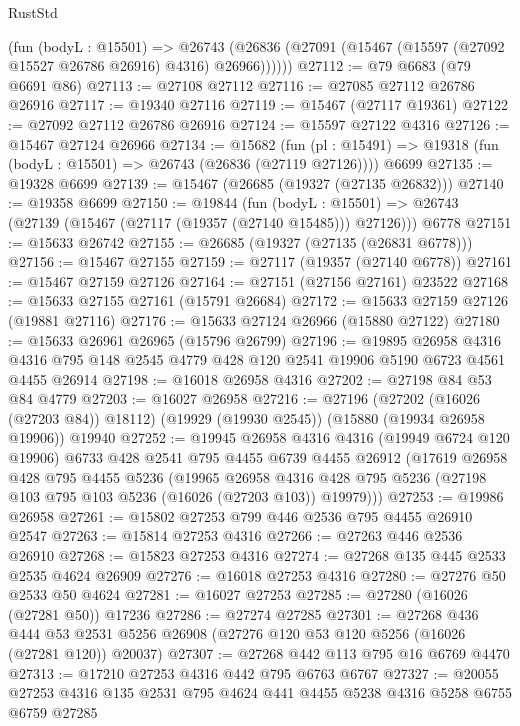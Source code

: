\begin{lexlean}{RustStd}
\begin{coremodule}
        (fun (bodyL : @15501) =>
        @26743 (@26836 (@27091 (@15467 (@15597 (@27092 @15527 @26786 @26916) @4316) @26966))))))
@27112 := @79 @6683 (@79 @6691 @86)
@27113 := @27108 @27112
@27116 := @27085 @27112 @26786 @26916
@27117 := @19340 @27116
@27119 := @15467 (@27117 @19361)
@27122 := @27092 @27112 @26786 @26916
@27124 := @15597 @27122 @4316
@27126 := @15467 @27124 @26966
@27134 := @15682
    (fun (pl : @15491) => @19318 (fun (bodyL : @15501) => @26743 (@26836 (@27119 @27126))))
    @6699
@27135 := @19328 @6699
@27139 := @15467 (@26685 (@19327 (@27135 @26832)))
@27140 := @19358 @6699
@27150 := @19844
    (fun (bodyL : @15501) => @26743 (@27139 (@15467 (@27117 (@19357 (@27140 @15485))) @27126)))
    @6778
@27151 := @15633 @26742
@27155 := @26685 (@19327 (@27135 (@26831 @6778)))
@27156 := @15467 @27155
@27159 := @27117 (@19357 (@27140 @6778))
@27161 := @15467 @27159 @27126
@27164 := @27151 (@27156 @27161) @23522
@27168 := @15633 @27155 @27161 (@15791 @26684)
@27172 := @15633 @27159 @27126 (@19881 @27116)
@27176 := @15633 @27124 @26966 (@15880 @27122)
@27180 := @15633 @26961 @26965 (@15796 @26799)
@27196 := @19895
    @26958
    @4316
    @4316
    @795
    @148
    @2545
    @4779
    @428
    @120
    @2541
    @19906
    @5190
    @6723
    @4561
    @4455
    @26914
@27198 := @16018 @26958 @4316
@27202 := @27198 @84 @53 @84 @4779
@27203 := @16027 @26958
@27216 := @27196
    (@27202 (@16026 (@27203 @84)) @18112)
    (@19929 (@19930 @2545))
    (@15880 (@19934 @26958 @19906))
    @19940
@27252 := @19945
    @26958
    @4316
    @4316
    (@19949 @6724 @120 @19906)
    @6733
    @428
    @2541
    @795
    @4455
    @6739
    @4455
    @26912
    (@17619
      @26958
      @428
      @795
      @4455
      @5236
      (@19965
        @26958
        @4316
        @428
        @795
        @5236
        (@27198 @103 @795 @103 @5236 (@16026 (@27203 @103)) @19979)))
@27253 := @19986 @26958
@27261 := @15802 @27253 @799 @446 @2536 @795 @4455 @26910 @2547
@27263 := @15814 @27253 @4316
@27266 := @27263 @446 @2536 @26910
@27268 := @15823 @27253 @4316
@27274 := @27268 @135 @445 @2533 @2535 @4624 @26909
@27276 := @16018 @27253 @4316
@27280 := @27276 @50 @2533 @50 @4624
@27281 := @16027 @27253
@27285 := @27280 (@16026 (@27281 @50)) @17236
@27286 := @27274 @27285
@27301 := @27268
    @436
    @444
    @53
    @2531
    @5256
    @26908
    (@27276 @120 @53 @120 @5256 (@16026 (@27281 @120)) @20037)
@27307 := @27268 @442 @113 @795 @16 @6769 @4470
@27313 := @17210 @27253 @4316 @442 @795 @6763 @6767
@27327 := @20055 @27253 @4316 @135 @2531 @795 @4624 @441 @4455 @5238 @4316 @5258 @6755 @6759 @27285

\end{coremodule}
\end{lexlean}
